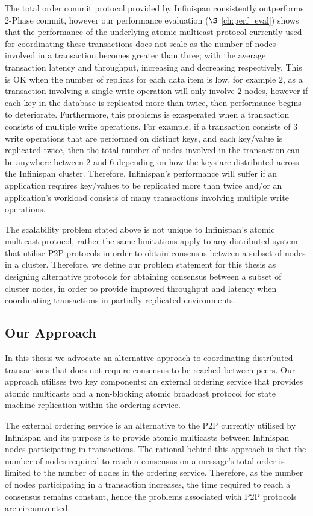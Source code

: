     The total order commit protocol provided by Infinispan consistently outperforms 2-Phase commit, however our performance evaluation ($\S$ \ref{ch:perf_eval}) shows that the performance of the underlying atomic multicast protocol currently used for coordinating these transactions does not scale as the number of nodes involved in a transaction becomes greater than three; with the average transaction latency and throughput, increasing and decreasing respectively.  This is OK when the number of replicas for each data item is low, for example $2$, as a transaction involving a single write operation will only involve $2$ nodes, however if each key in the database is replicated more than twice, then performance begins to deteriorate.  Furthermore, this problems is exasperated when a transaction consists of multiple write operations.  For example, if a transaction consists of  $3$ write operations that are performed on distinct keys, and each key/value is replicated twice, then the total number of nodes involved in the transaction can be anywhere between $2$ and $6$ depending on how the keys are distributed across the Infinispan cluster.  Therefore, Infinispan's performance will suffer if an application requires key/values to be replicated more than twice and/or an application's workload consists of many transactions involving multiple write operations.  
    
    The scalability problem stated above is not unique to Infinispan's atomic multicast protocol, rather the same limitations apply to any distributed system that utilise P2P protocols in order to obtain consensus between a subset of nodes in a cluster.  Therefore, we define our problem statement for this thesis as designing alternative protocols for obtaining consensus between a subset of cluster nodes, in order to provide improved throughput and latency when coordinating transactions in partially replicated environments.  
    
    \subsection{Our Approach}    
    In this thesis we advocate an alternative approach to coordinating distributed transactions that does not require consensus to be reached between peers.  Our approach utilises two key components: an external ordering service that provides atomic multicasts and a non-blocking atomic broadcast protocol for state machine replication within the ordering service.  
   
   The external ordering service is an alternative to the P2P currently utilised by Infinispan and its purpose is to provide atomic multicasts between Infinispan nodes participating in transactions.  The rational behind this approach is that the number of nodes required to reach a consensus on a message's total order is limited to the number of nodes in the ordering service.  Therefore, as the number of nodes participating in a transaction increases, the time required to reach a consensus remains constant, hence the problems associated with P2P protocols are circumvented.

